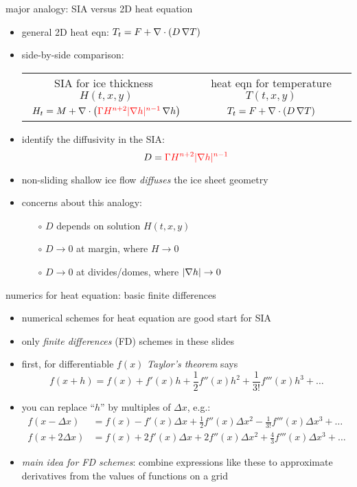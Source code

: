 \begin{frame}{major analogy: SIA versus 2D heat equation}

\begin{itemize}
\item general 2D heat eqn: \quad $T_t = F + \nabla\cdot (D\, \nabla T)$
\item side-by-side comparison:

\medskip
\begin{tabular}{cc}
\scriptsize SIA for ice thickness \, $H(t,x,y)$ & \scriptsize heat eqn for temperature $T(t,x,y)$ \normalsize \medskip \\
	\hspace{-6mm} $H_t = M + \nabla\cdot \left({\color{red}\Gamma H^{n+2} |\nabla h|^{n-1}}\, \nabla h \right)$  &  $T_t = F + \nabla\cdot (D\, \nabla T)$
\end{tabular} 

\medskip
\item identify the diffusivity in the SIA:
	$$D = {\color{red}\Gamma H^{n+2} |\nabla h|^{n-1}}$$
\item non-sliding shallow ice flow \emph{diffuses} the ice sheet geometry
\item concerns about this analogy:
  \begin{itemize}
  \item[$\circ$]  $D$ depends on solution $H(t,x,y)$
  \item[$\circ$]  $D\to 0$ at margin, where $H\to 0$
  \item[$\circ$]  $D\to 0$ at divides/domes, where $|\nabla h|\to 0$
  \end{itemize}
\end{itemize}
\end{frame}


\begin{frame}{numerics for heat equation: basic finite differences}

\begin{itemize}
\item numerical schemes for heat equation are good start for SIA
\item only \emph{finite differences} (FD) schemes in these slides

\bigskip
\item first, for differentiable $f(x)$ \emph{Taylor's theorem} says
	$$f(x+h) = f(x) + f'(x) h + \frac{1}{2} f''(x) h^2 + \frac{1}{3!} f'''(x) h^3 + \dots$$
\normalsize
\item you can replace ``$h$'' by multiples of $\Delta x$, e.g.:
\small
\begin{align*}
f(x-\Delta x) &= f(x) - f'(x) \Delta x + \frac{1}{2} f''(x) \Delta x^2 - \frac{1}{3!} f'''(x) \Delta x^3 + \dots \\
f(x+2\Delta x) &= f(x) + 2 f'(x) \Delta x + 2 f''(x) \Delta x^2 + \frac{4}{3} f'''(x) \Delta x^3 + \dots
\end{align*}
\normalsize
\item \emph{main idea for FD schemes}:  combine expressions like these to approximate derivatives from the values of functions on a grid
\end{itemize}
\end{frame}


